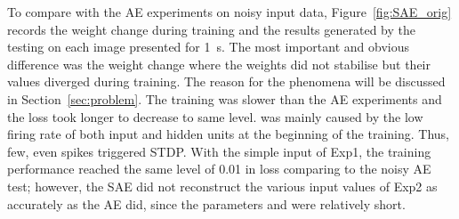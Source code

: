 To compare with the AE experiments on noisy input data, Figure~\ref{fig:SAE_orig} records the weight change during training and the results generated by the testing on each image presented for 1~s.
The most important and obvious difference was the weight change where the weights did not stabilise but their values diverged during training.
The reason for the phenomena will be discussed in Section~\ref{sec:problem}.
The training was slower than the AE experiments and the loss took longer \protect{} to decrease to \protect{} \protect{} same level.
\protect{}
\protect{} was mainly caused by the low firing rate of both input and hidden units at the beginning of the training.
Thus, few, even \protect{} \protect{} spikes triggered STDP.
With the simple input of Exp1, the training performance reached the same level of 0.01 in loss comparing to the noisy AE test;
however, the SAE did not reconstruct the various input values of Exp2 as accurately as the AE did, since the parameters \protect{} \protect{} and \protect{} \protect{} were relatively short.

